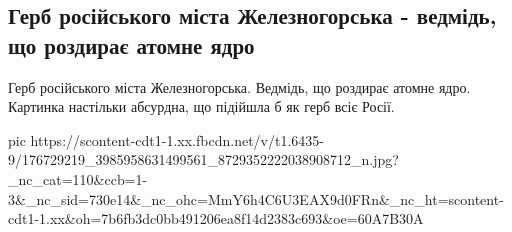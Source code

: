  
 
 
 
 
\subsection{Герб російського міста Железногорська - ведмідь, що роздирає атомне ядро}
\label{sec:22_04_2021.fb.lustyk_anatolij.1.gerb_absurd_zheleznogorsk_atom_rossia}

Герб російського міста Железногорська. Ведмідь, що роздирає атомне ядро.
Картинка настільки абсурдна, що підійшла б як герб всіє Росії.


\ifcmt
  pic https://scontent-cdt1-1.xx.fbcdn.net/v/t1.6435-9/176729219_3985958631499561_8729352222038908712_n.jpg?_nc_cat=110&ccb=1-3&_nc_sid=730e14&_nc_ohc=MmY6h4C6U3EAX9d0FRn&_nc_ht=scontent-cdt1-1.xx&oh=7b6fb3dc0bb491206ea8f14d2383c693&oe=60A7B30A
\fi

